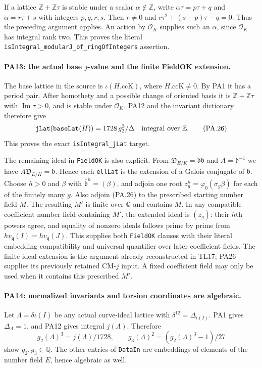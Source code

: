 If a lattice $\mathbb Z+\mathbb Z\tau$ is stable under a
scalar $\alpha\notin\mathbb Z$, write
$\alpha\tau=p\tau+q$ and $\alpha=r\tau+s$ with integers
$p,q,r,s$. Then $r\ne0$ and
$r\tau^2+(s-p)\tau-q=0$. Thus the preceding argument applies.
An action by $\mathcal O_K$ supplies such an $\alpha$, since
$\mathcal O_K$ has integral rank two. This proves the literal
\texttt{isIntegral\_modularJ\_of\_ringOfIntegers} assertion.

\paragraph{PA13: the actual base $j$-value and the finite FieldOK extension.}
The base lattice in the source is $\iota(H.\mathrm{ccK})$,
where $H.\mathrm{ccK}\ne0$. By PA1 it has a period pair.
After homothety and a possible change of oriented basis it is
$\mathbb Z+\mathbb Z\tau$ with $\operatorname{Im}\tau>0$,
and is stable under $\mathcal O_K$. PA12 and the invariant
dictionary therefore give
\[
 \texttt{jLat}(\texttt{baseLat}(H))
       =1728\,g_2^3/\Delta\quad\hbox{integral over }\mathbb Z.
                                                               \tag{PA.26}
\]
This proves the exact \texttt{isIntegral\_jLat} target.

The remaining ideal in \texttt{FieldOK} is also explicit.
From $\mathfrak D_{E/K}=\mathfrak b\bar{\mathfrak b}$ and
$A=\mathfrak b^{-1}$ we have
$A\mathfrak D_{E/K}=\bar{\mathfrak b}$. Hence each
\texttt{ellLat} is the extension of a Galois conjugate of
$\bar{\mathfrak b}$. Choose $h>0$ and $\beta$ with
$\bar{\mathfrak b}^{h}=(\beta)$, and adjoin one root
$z_g^h=\varphi_0(\sigma_g\beta)$ for each of the finitely many
$g$. Also adjoin (PA.26) to the prescribed starting number field
$M$. The resulting $M'$ is finite over $\mathbb Q$ and contains
$M$. In any compatible coefficient number field containing
$M'$, the extended ideal is $(z_g)$: their $h$th powers agree,
and equality of nonzero ideals follows prime by prime from
$h v_{\mathfrak q}(I)=h v_{\mathfrak q}(J)$.
This supplies both \texttt{FieldOK} clauses with their literal
embedding compatibility and universal quantifier over later
coefficient fields. The finite ideal extension is the argument
already reconstructed in TL17; PA26 supplies its previously
retained CM-$j$ input. A fixed coefficient field may only be
used when it contains this prescribed $M'$.

\paragraph{PA14: normalized invariants and torsion coordinates are algebraic.}
Let $\Lambda=\delta\iota(I)$ be any actual curve-ideal lattice
with $\delta^{12}=\Delta_{\iota(I)}$. PA1 gives
$\Delta_\Lambda=1$, and PA12 gives integral $j(\Lambda)$.
Therefore
\[
 g_2(\Lambda)^3=j(\Lambda)/1728,\qquad
 g_3(\Lambda)^2=(g_2(\Lambda)^3-1)/27                         \tag{PA.27}
\]
show $g_2,g_3\in\overline{\mathbb Q}$. The other entries of
\texttt{DataIn} are embeddings of elements of the number field
$E$, hence algebraic as well.

